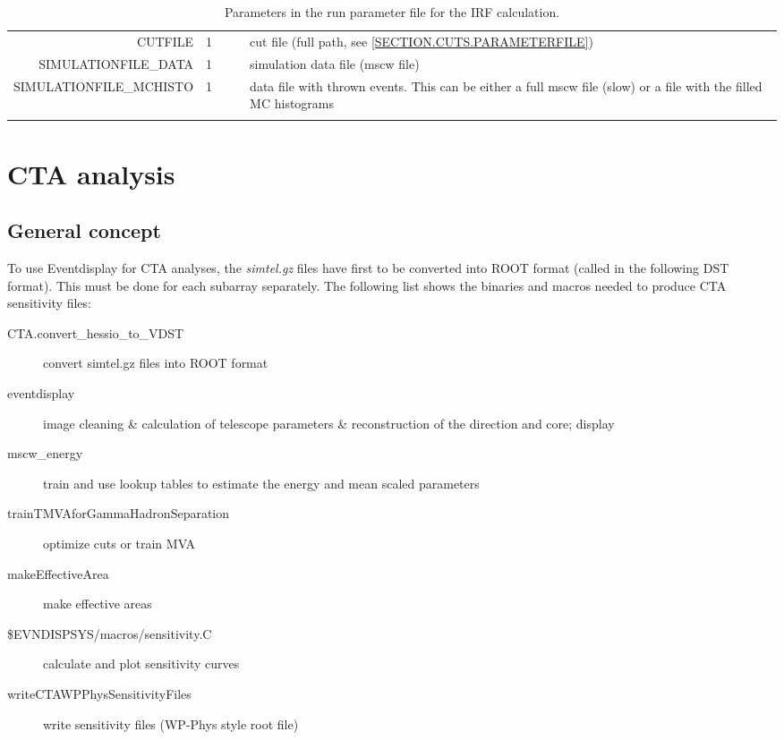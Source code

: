 \documentclass[titlepage,a4paper,twoside,11pt]{report}
\begin{document}
\begin{small}
\begin{longtable}{r  r  r r  p{3.5cm}}
CUTFILE & 1 & & & cut file (full path, see \ref{SECTION.CUTS.PARAMETERFILE}) \\

SIMULATIONFILE\_DATA & 1  & & & simulation data file (mscw file) \\

SIMULATIONFILE\_MCHISTO  & 1  & & & data file with thrown events. This can be either a full mscw file (slow) or a file with the filled MC histograms \\

\bottomrule
\caption{Parameters in the run parameter file for the IRF calculation.}
\end{longtable}
\end{small}


%
%

\chapter{CTA analysis}

\section{General concept}

To use Eventdisplay for CTA analyses, the {\it simtel.gz} files have first to be converted into ROOT format (called in the following DST format). 
This must be done for each subarray separately.
The following list shows the binaries and macros needed to produce CTA sensitivity files:

\begin{description}
\item[CTA.convert\_hessio\_to\_VDST]
        convert simtel.gz files into ROOT format

\item[eventdisplay]
	image cleaning \& calculation of telescope parameters \& reconstruction of the direction and core; display

\item[mscw\_energy]
        train and use lookup tables to estimate the energy and mean scaled parameters
        
\item[trainTMVAforGammaHadronSeparation]
        optimize cuts or train MVA

\item[makeEffectiveArea]
        make effective areas

\item[\$EVNDISPSYS/macros/sensitivity.C]
        calculate and plot sensitivity curves

\item[writeCTAWPPhysSensitivityFiles]
        write sensitivity files (WP-Phys style root file)
        
\end{description}
\end{document}
